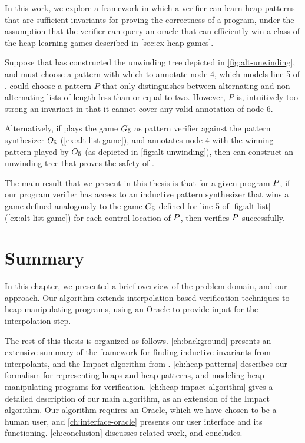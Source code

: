 In this work, we explore a framework in which a verifier can learn heap patterns that are sufficient invariants for proving the correctness of a program, under the assumption that the verifier can query an oracle that can efficiently win a class of the heap-learning games described in \autoref{sec:ex-heap-games}.
%
\begin{ex}
  \label{ex:alt-list-pat-syn}
  Suppose that \verifier has constructed the unwinding tree depicted
  in \autoref{fig:alt-unwinding}, and must choose a pattern with which
  to annotate node $4$, which models line 5 of \altlist.
  \verifier could choose a pattern $P$ that only distinguishes between
  alternating and non-alternating lists of length less than or equal
  to two.
  However, $P$ is, intuitively too strong an invariant in that it
  cannot cover any valid annotation of node $6$.

  Alternatively, if \verifier plays the game $G_5$ as pattern
  verifier against the pattern synthesizer $O_5$
  (\autoref{ex:alt-list-game}), and annotates node $4$ with the
  winning pattern played by $O_5$ (as depicted in
  \autoref{fig:alt-unwinding}), then \verifier can construct an
  unwinding tree that proves the safety of \altlist.
\end{ex}

The main result that we present in this thesis is that for a given
program $P$, if our program verifier \verifier has access to an
inductive pattern synthesizer that wins a game defined analogously to
the game $G_5$ defined for line 5 of \autoref{fig:alt-list}
(\autoref{ex:alt-list-game}) for each control location of $P$,
then \verifier verifies $P$ successfully.

\section*{Summary}
In this chapter, we presented a brief overview of the problem domain, and our approach. Our algorithm extends interpolation-based verification techniques to heap-manipulating programs, using an Oracle to provide input for the interpolation step.

The rest of this thesis is organized as follows. \autoref{ch:background} presents an extensive summary of the framework for finding inductive invariants from interpolants, and the Impact algorithm from \cite{mcmillan06}. \autoref{ch:heap-patterns} describes our formalism for representing heaps and heap patterns, and modeling heap-manipulating programs for verification. \autoref{ch:heap-impact-algorithm} gives a detailed description of our main algorithm, as an extension of the Impact algorithm. Our algorithm requires an Oracle, which we have chosen to be a human user, and \autoref{ch:interface-oracle} presents our user interface and its functioning. \autoref{ch:conclusion} discusses related work, and concludes.

